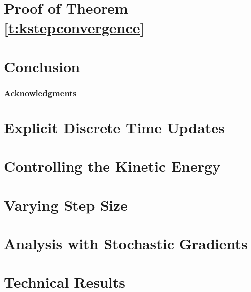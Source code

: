 \documentclass[final,12pt]{colt2018} %
\begin{document}
\section{Proof of Theorem \ref{t:kstepconvergence}}

\section{Conclusion}

\subsubsection*{Acknowledgments}

\nocite{*}
 
\appendix
\newpage
\section{Explicit Discrete Time Updates}

\section{Controlling the Kinetic Energy}

\section{Varying Step Size}

\section{Analysis with Stochastic Gradients}

\section{Technical Results}

%
\end{document}
